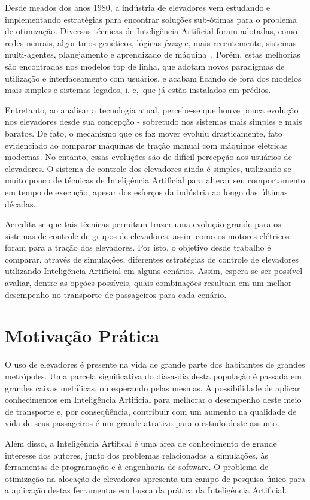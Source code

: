 Desde meados dos anos 1980, a indústria de elevadores vem estudando e implementando estratégias para encontrar soluções sub-ótimas para o problema de otimização. Diversas técnicas de Inteligência Artificial foram adotadas, como redes neurais, algoritmos genéticos, lógicas \textit{fuzzy} e, mais recentemente, sistemas multi-agentes, planejamento e aprendizado de máquina~\cite{KOEHLEROTTIGER02}. Porém, estas melhorias são encontradas nos modelos top de linha, que adotam novos paradigmas de utilização e interfaceamento com usuários, e acabam ficando de fora dos modelos mais simples e sistemas legados, i. e,~que já estão instalados em prédios.

Entretanto, ao analisar a tecnologia atual, percebe-se que houve pouca evolução nos elevadores desde sua concepção - sobretudo nos sistemas mais simples e mais baratos. De fato, o mecanismo que os faz mover evoluiu drasticamente, fato evidenciado ao comparar máquinas de tração manual com máquinas elétricas modernas. No entanto, essas evoluções são de difícil percepção aos usuários de elevadores. O sistema de controle dos elevadores ainda é simples, utilizando-se muito pouco de técnicas de Inteligência Artificial para alterar seu comportamento em tempo de execução, apesar dos esforços da indústria ao longo das últimas décadas.

Acredita-se que tais técnicas permitam trazer uma evolução grande para os sistemas de controle de grupos de elevadores, assim como os motores elétricos foram para a tração dos elevadores. Por isto, o objetivo desde trabalho é comparar, através de simulações, diferentes estratégias de controle de elevadores utilizando Inteligência Artificial em alguns cenários. Assim, espera-se ser possível avaliar, dentre as opções possíveis, quais combinações resultam em um melhor desempenho no transporte de passageiros para cada cenário.

\section{Motivação Prática}

O uso de elevadores é presente na vida de grande parte dos habitantes de grandes metrópoles. Uma parcela significativa do dia-a-dia desta população é passada em grandes caixas metálicas, ou esperando pelas mesmas. A possibilidade de aplicar conhecimentos em Inteligência Artificial para melhorar o desempenho deste meio de transporte e, por conseqüência, contribuir com um aumento na qualidade de vida de seus passageiros é um grande atrativo para o estudo deste assunto.

Além disso, a Inteligência Artifical é uma área de conhecimento de grande interesse dos autores, junto dos problemas relacionados a simulações, às ferramentas de programação e à engenharia de software. O problema de otimização na alocação de elevadores apresenta um campo de pesquisa único para a aplicação destas ferramentas em busca da prática da Inteligência Artificial.